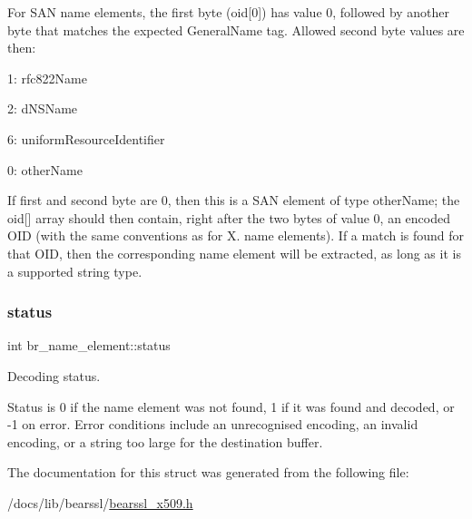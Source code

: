 For S\+AN name elements, the first byte ({\ttfamily oid\mbox{[}0\mbox{]}}) has value 0, followed by another byte that matches the expected General\+Name tag. Allowed second byte values are then\+:


\begin{DoxyItemize}
\item 1\+: {\ttfamily rfc822\+Name}
\item 2\+: {\ttfamily d\+N\+S\+Name}
\item 6\+: {\ttfamily uniform\+Resource\+Identifier}
\item 0\+: {\ttfamily other\+Name}
\end{DoxyItemize}

If first and second byte are 0, then this is a S\+AN element of type {\ttfamily other\+Name}; the {\ttfamily oid\mbox{[}\mbox{]}} array should then contain, right after the two bytes of value 0, an encoded O\+ID (with the same conventions as for X. name elements). If a match is found for that O\+ID, then the corresponding name element will be extracted, as long as it is a supported string type. \mbox{\label{structbr__name__element_a19c2c4bf8e97473e995130193eec553b}} 
\subsubsection{\texorpdfstring{status}{status}}
{\footnotesize\ttfamily int br\+\_\+name\+\_\+element\+::status}



Decoding status. 

Status is 0 if the name element was not found, 1 if it was found and decoded, or -\/1 on error. Error conditions include an unrecognised encoding, an invalid encoding, or a string too large for the destination buffer. 

The documentation for this struct was generated from the following file\+:\begin{DoxyCompactItemize}
\item 
/docs/lib/bearssl/\hyperlink{bearssl__x509_8h}{bearssl\+\_\+x509.\+h}\end{DoxyCompactItemize}
